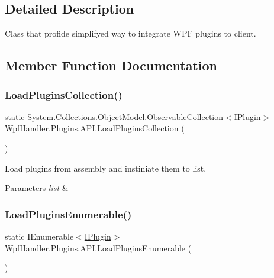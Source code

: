 \subsection{Detailed Description}
Class that profide simplifyed way to integrate W\+PF plugins to client. 



\subsection{Member Function Documentation}
\mbox{\label{class_wpf_handler_1_1_plugins_1_1_a_p_i_aa797a592049cf57860ee422586fcccac}} 
\subsubsection{\texorpdfstring{Load\+Plugins\+Collection()}{LoadPluginsCollection()}}
{\footnotesize\ttfamily static System.\+Collections.\+Object\+Model.\+Observable\+Collection$<$\mbox{\hyperlink{interface_wpf_handler_1_1_plugins_1_1_i_plugin}{I\+Plugin}}$>$ Wpf\+Handler.\+Plugins.\+A\+P\+I.\+Load\+Plugins\+Collection (\begin{DoxyParamCaption}{ }\end{DoxyParamCaption})\hspace{0.3cm}{\ttfamily [static]}}



Load plugins from assembly and instiniate them to list. 


\begin{DoxyParams}{Parameters}
{\em list} & \\
\hline
\end{DoxyParams}
\mbox{\label{class_wpf_handler_1_1_plugins_1_1_a_p_i_ae2d2c46617f63533ddc20f08166b6c6e}} 
\subsubsection{\texorpdfstring{Load\+Plugins\+Enumerable()}{LoadPluginsEnumerable()}}
{\footnotesize\ttfamily static I\+Enumerable$<$\mbox{\hyperlink{interface_wpf_handler_1_1_plugins_1_1_i_plugin}{I\+Plugin}}$>$ Wpf\+Handler.\+Plugins.\+A\+P\+I.\+Load\+Plugins\+Enumerable (\begin{DoxyParamCaption}{ }\end{DoxyParamCaption})\hspace{0.3cm}{\ttfamily [static]}}



